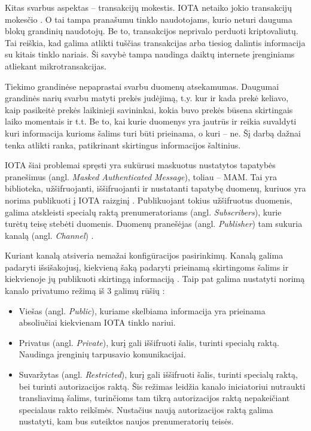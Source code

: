 Kitas svarbus aspektas – transakcijų mokestis. IOTA netaiko jokio transakcijų mokesčio \cite{zivic2019distributed}. O tai tampa pranašumu tinklo naudotojams, kurio neturi dauguma blokų grandinių naudotojų. Be to, transakcijos neprivalo perduoti kriptovaliutų. Tai reiškia, kad galima atlikti tuščias transakcijas arba tiesiog dalintis informacija su kitais tinklo nariais. Ši savybė tampa naudinga daiktų internete įrenginiams atliekant mikrotransakcijas.





Tiekimo grandinėse nepaprastai svarbu duomenų atsekamumas. Daugumai grandinės narių svarbu matyti prekės judėjimą, t.y. kur ir kada prekė keliavo, kaip pasikeitė prekės laikinieji savininkai, kokia buvo prekės būsena skirtingais laiko momentais ir t.t. Be to, kai kurie duomenys yra jautrūs ir reikia suvaldyti kuri informacija kurioms šalims turi būti prieinama, o kuri – ne. Šį darbą dažnai tenka atlikti ranka, patikrinant skirtingus informacijos šaltinius.

IOTA šiai problemai spręsti yra sukūrusi maskuotus nustatytos tapatybės pranešimus (angl. \textit{Masked Authenticated Message}), toliau – MAM. Tai yra biblioteka, užšifruojanti, iššifruojanti ir nustatanti tapatybę duomenų, kuriuos yra norima publikuoti į IOTA raizginį \cite{andreas2017masked}. Publikuojant tokius užšifruotus duomenis, galima atskleisti specialų raktą prenumeratoriams (angl. \textit{Subscribers}), kurie turėtų teisę stebėti duomenis. Duomenų pranešėjas (angl. \textit{Publisher}) tam sukuria kanalą (angl. \textit{Channel}) \cite{ab2018iota}.

Kuriant kanalą atsiveria nemažai konfigūracijos pasirinkimų. Kanalą galima padaryti išsišakojusį, kiekvieną šaką padaryti prieinamą skirtingoms šalims ir kiekvienoje jų publikuoti skirtingą informaciją \cite{ab2018iota}. Taip pat galima nustatyti norimą kanalo privatumo režimą iš 3 galimų rūšių \cite{paul2017introducing}:
\begin{itemize}
    \item Viešas (angl. \textit{Public}), kuriame skelbiama informacija yra prieinama absoliučiai kiekvienam IOTA tinklo nariui.
    \item Privatus (angl. \textit{Private}), kurį gali iššifruoti šalis, turinti specialų raktą. Naudinga įrenginių tarpusavio komunikacijai.
    \item Suvaržytas (angl. \textit{Restricted}), kurį gali iššifruoti šalis, turinti specialų raktą, bei turinti autorizacijos raktą. Šis režimas leidžia kanalo iniciatoriui nutraukti transliavimą šalims, turinčioms tam tikrą autorizacijos raktą nepakeičiant specialaus rakto reikšmės. Nustačius naują autorizacijos raktą galima nustatyti, kam bus suteiktos naujos prenumeratorių teisės.
\end{itemize}

